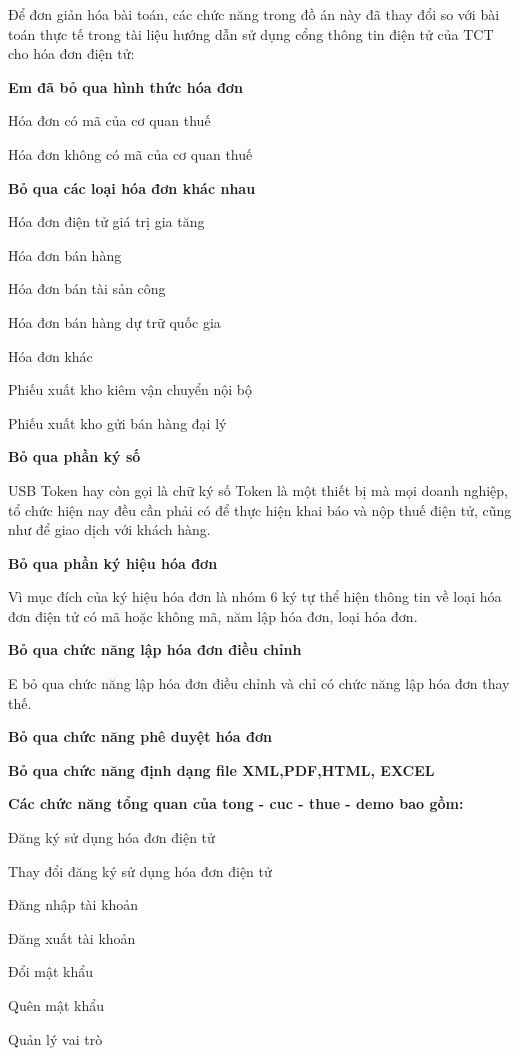 Để đơn giản hóa bài toán, các chức năng trong đồ án này đã thay đổi so với bài toán thực tế trong tài liệu hướng dẫn sử dụng cổng thông tin điện tử của TCT cho hóa đơn điện tử:

\textbf{Em đã bỏ qua hình thức hóa đơn}

Hóa đơn có mã của cơ quan thuế

Hóa đơn không có mã của cơ quan thuế

\textbf{Bỏ qua các loại hóa đơn khác nhau}

Hóa đơn điện tử giá trị gia tăng

Hóa đơn bán hàng

Hóa đơn bán tài sản công

Hóa đơn bán hàng dự trữ quốc gia

Hóa đơn khác

Phiếu xuất kho kiêm vận chuyển nội bộ

Phiếu xuất kho gửi bán hàng đại lý

\textbf{Bỏ qua phần ký số}

USB Token hay còn gọi là chữ ký số Token là một thiết bị mà mọi doanh nghiệp, tổ chức hiện nay đều cần phải có để thực hiện khai báo và nộp thuế điện tử, cũng như để giao dịch với khách hàng.

\textbf{Bỏ qua phần ký hiệu hóa đơn}

Vì mục đích của ký hiệu hóa đơn là nhóm 6 ký tự thể hiện thông tin về loại hóa đơn điện tử có mã hoặc không mã, năm lập hóa đơn, loại hóa đơn.

\textbf{Bỏ qua chức năng lập hóa đơn điều chỉnh}

E bỏ qua chức năng lập hóa đơn điều chỉnh và chỉ có chức năng lập hóa đơn thay thế.

\textbf{Bỏ qua chức năng phê duyệt hóa đơn}

\textbf{Bỏ qua chức năng định dạng file XML,PDF,HTML, EXCEL}

\textbf{Các chức năng tổng quan của tong - cuc - thue - demo bao gồm:}


Đăng ký sử dụng hóa đơn điện tử

Thay đổi đăng ký sử dụng hóa đơn điện tử

Đăng nhập tài khoản

Đăng xuất tài khoản

Đổi mật khẩu

Quên mật khẩu


Quản lý vai trò

